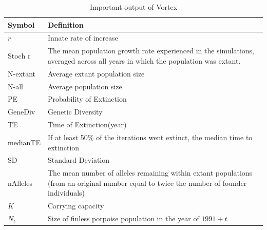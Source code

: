\documentclass{mcmthesis}
\numberwithin{figure}{section}
\numberwithin{table}{section}
\numberwithin{equation}{section}
\begin{document}



\begin{table}[htpb!]
  \centering
  \caption{Important output of Vortex } \label{Vortex_out}
  \begin{tabular}{m{2.5cm}<{\centering}|m{12.5cm}<{\centering}}
    \toprule[1.5pt]
    \textbf{Symbol} & \textbf{Definition}\\ \hline
    $ r $ & Innate rate of increase \\
    Stoch r & The mean population growth rate experienced in the simulations, averaged 
    across all years in which the population was extant. \\
    N-extant  & Average extant population size\\ 
    N-all  & Average population size \\
    PE  & Probability of Extinction \\
    GeneDiv  &  Genetic Diversity \\
    TE & Time of Extinction(year) \\
    medianTE & If at least 50\% of the iterations went extinct, 
    the median time to extinction \\
    SD & Standard Deviation \\
    nAlleles & The mean number of alleles remaining within extant populations 
    (from an original number equal to twice the number of founder individuals)\\
    $ K $ & Carrying capacity \\ 
    $ N_t $ & Size of finless porpoise population in the year of $ 1991 + t $ \\ 
    \bottomrule[1.5pt]
  \end{tabular}
\end{table} 
\end{document}
